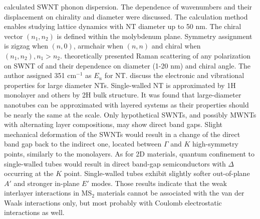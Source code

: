 \citeauthor{Dobardzic2005} calculated  SWNT phonon dispersion. The dependence of wavenumbers and their displacement on chirality and diameter were discussed. The calculation method enables studying lattice dynamics with NT diameter up to 50 nm. The chiral vector $(n_1, n_2)$ is defined within the molybdenum plane. Symmetry assignment is zigzag when $(n,0)$, armchair when $(n,n)$ and chiral when $(n_1, n_2), n_1>n_2$. \citeauthor{Dobardzic2006} theoretically presented Raman scattering of any polarization on SWNT of  and their dependence on diameter (1-20 nm) and chiral angle. The author assigned 351 cm$^{-1}$ as $E_u$ for  NT.\cite{Dobardzic2006} \citeauthor{Ghorbani-Asl2013} discuss the electronic and vibrational properties for large diameter  NTs\cite{Ghorbani-Asl2013}. Single-walled NT is approximated by 1H monolayer and others by 2H bulk structure. It was found that large-diameter nanotubes can be approximated with layered systems as their properties should be nearly the same at the scale. Only hypothetical SWNTs, and possibly MWNTs with alternating layer compositions, may show direct band gaps. Slight mechanical deformation of the SWNTs would result in a change of the direct band gap back to the indirect one, located between $\Gamma$ and $K$ high-symmetry points, similarly to the monolayers. As for 2D materials, quantum confinement to single-walled tubes would result in direct band-gap semiconductors with $\Delta$ occurring at the $K$ point. Single-walled tubes exhibit slightly softer out-of-plane $A'$ and stronger in-plane $E'$ modes. Those results indicate that the weak interlayer interactions in MS$_2$ materials cannot be associated with the van der Waals interactions only, but most probably with Coulomb electrostatic interactions as well.

